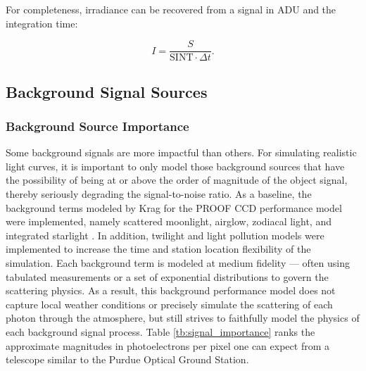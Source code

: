 For completeness, irradiance can be recovered from a signal in ADU and the integration time:

\begin{equation} \label{eq:count_to_irrad}
  I = \frac{S}{\textrm{SINT} \cdot \Delta t}.
\end{equation}

\subsection{Background Signal Sources}

\subsubsection{Background Source Importance}

Some background signals are more impactful than others. For simulating realistic light curves, it is important to only model those background sources that have the possibility of being at or above the order of magnitude of the object signal, thereby seriously degrading the signal-to-noise ratio. As a baseline, the background terms modeled by Krag for the PROOF CCD performance model were implemented, namely scattered moonlight, airglow, zodiacal light, and integrated starlight \cite{krag2003}. In addition, twilight and light pollution models were implemented to increase the time and station location flexibility of the simulation. Each background term is modeled at medium fidelity --- often using tabulated measurements or a set of exponential distributions to govern the scattering physics. As a result, this background performance model does not capture local weather conditions or precisely simulate the scattering of each photon through the atmosphere, but still strives to faithfully model the physics of each background signal process. Table \ref{tb:signal_importance} ranks the approximate magnitudes in photoelectrons per pixel one can expect from a telescope similar to the Purdue Optical Ground Station.

